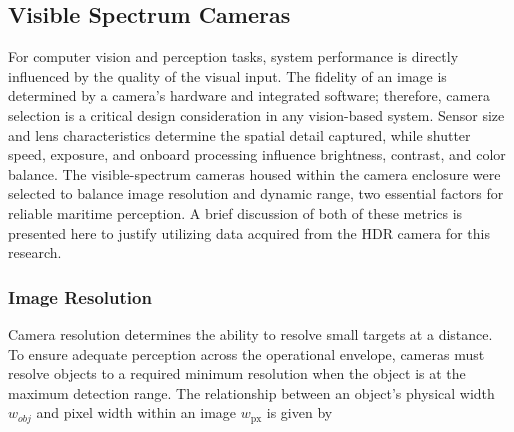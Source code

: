 \documentclass{erauthesis}
\begin{document}
\subsection{Visible Spectrum Cameras} \label{visual_cameras}
% 


For computer vision and perception tasks, system performance is directly influenced by the quality of the visual input.
The fidelity of an image is determined by a camera's hardware and integrated software; therefore, camera selection is a critical design consideration in any vision-based system. 
Sensor size and lens characteristics determine the spatial detail captured, while shutter speed, exposure, and onboard processing influence brightness, contrast, and color balance. 
The visible-spectrum cameras housed within the camera enclosure were selected to balance image resolution and dynamic range, two essential factors for reliable maritime perception.
A brief discussion of both of these metrics is presented here to justify utilizing data acquired from the \ac{HDR} camera for this research.

\subsubsection{Image Resolution}
\label{image_resolution}
Camera resolution determines the ability to resolve small targets at a distance.
To ensure adequate perception across the operational envelope, cameras must resolve objects to a required minimum resolution when the object is at the maximum detection range.
The relationship between an object's physical width $\mathit{w}_{obj}$ and pixel width within an image $\mathit{w}_{\text{px}}$ is given by
\end{document}
